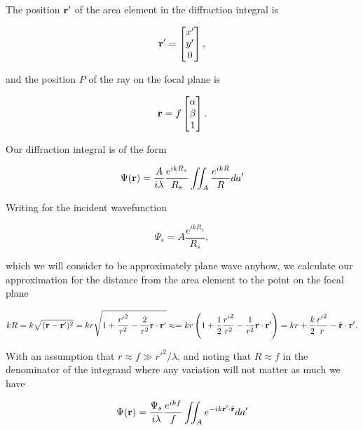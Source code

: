 {The position $\mathbf{r}'$ of the area element in the diffraction integral is

\begin{equation}\label{eqn:modernOptics:ProblemSet2:P1:50}
\mathbf{r}' =
\begin{bmatrix}
x' \\
y' \\
0
\end{bmatrix},
\end{equation}

and the position $P$ of the ray on the focal plane is

\begin{equation}\label{eqn:modernOptics:ProblemSet2:P1:70}
\mathbf{r} = f 
\begin{bmatrix}
\alpha \\
\beta \\
1
\end{bmatrix}.
\end{equation}

Our diffraction integral is of the form

\begin{equation}\label{eqn:modernOptics:ProblemSet2:P1:90}
\Psi(\mathbf{r}) = \frac{A}{i \lambda} \frac{e^{i k R_s}}{R_s} \iint_A \frac{e^{i k R}}{R} da'
\end{equation}

Writing for the incident wavefunction

\begin{equation}\label{eqn:modernOptics:ProblemSet2:P1:110}
\Psi_s = A \frac{e^{i k R_s}}{R_s},
\end{equation}

which we will consider to be approximately plane wave anyhow, we calculate our approximation for the distance from the area element to the point on the focal plane

\begin{dmath}\label{eqn:modernOptics:ProblemSet2:P1:130}
k R 
= k \sqrt{ (\Br - \Br')^2 } 
= k r \sqrt{ 1 + \frac{{r'}^2}{r^2} - \frac{2}{r^2} \Br \cdot \Br' } 
\approx
= k r \left( 1 + \inv{2} \frac{{r'}^2}{r^2} - \frac{1}{r^2} \Br \cdot \Br' \right)
= k r + \frac{k}{2} \frac{{r'}^2}{r} - \rcap \cdot \Br' .
\end{dmath}

With an assumption that $r \approx f \gg {r'}^2/\lambda$, and noting that $R \approx f$ in the denominator of the integrand where any variation will not matter as much we have

\begin{equation}\label{eqn:modernOptics:ProblemSet2:P1:150}
\Psi(\mathbf{r}) = \frac{\Psi_s}{i \lambda} \frac{e^{i k f}}{f} \iint_A e^{-i k \mathbf{r}' \cdot \hat{\mathbf{r}} } da'
\end{equation}

}

